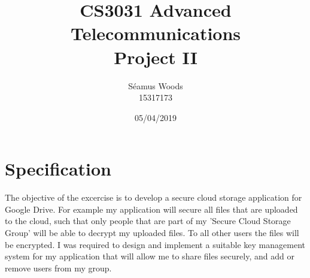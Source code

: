 \documentclass[12pt]{report}
\title{CS3031 Advanced Telecommunications \\ Project II}
\author{Séamus Woods \\ 15317173}
\date{05/04/2019}
\begin{document}
\maketitle
\newpage


\section{Specification}
The objective of the excercise is to develop a secure cloud storage application for Google Drive. For example my application will secure all files that are uploaded to the cloud, such that only people that are part of my 'Secure Cloud Storage Group' will be able to decrypt my uploaded files. To all other users the files will be encrypted. I was required to design and implement a suitable key management system for my application that will allow me to share files securely, and add or remove users from my group. 
\newline
\end{document}
